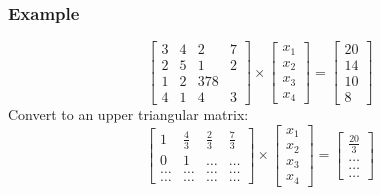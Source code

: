 \documentclass[letterpaper, 12pt]{math}
\begin{document}
\subsubsection*{Example}
\[ \begin{bmatrix}
  3 & 4 & 2 & 7 \\
  2 & 5 & 1 & 2 \\
  1 & 2 & 3 7 8 \\
  4 & 1 & 4 & 3
\end{bmatrix}\times\begin{bmatrix}
  x_1 \\ x_2 \\ x_3 \\ x_4
\end{bmatrix} = \begin{bmatrix}
  20 \\ 14 \\ 10 \\ 8
\end{bmatrix} \]
Convert to an upper triangular matrix:
\[ \begin{bmatrix}
  1 & \frac{4}{3} & \frac{2}{3} & \frac{7}{3} \\
  0 & 1 & \dots & \dots \\
  \dots & \dots & \dots & \dots \\
  \dots & \dots & \dots & \dots
\end{bmatrix}\times\begin{bmatrix}
  x_1 \\ x_2 \\ x_3 \\ x_4
\end{bmatrix} = \begin{bmatrix}
  \frac{20}{3} \\ \dots \\ \dots \\ \dots
\end{bmatrix} \]
\end{document}
